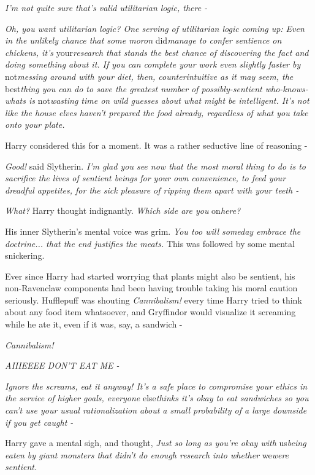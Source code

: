 \emph{I'm not quite sure that's valid utilitarian logic, there -}

\emph{Oh, you want utilitarian logic? One serving of utilitarian logic
coming up: Even in the unlikely chance that some moron} did\emph{manage
to confer sentience on chickens, it's} your\emph{research that stands
the best chance of discovering the fact and doing something about it. If
you can complete your work even slightly faster by} not\emph{messing
around with your diet, then, counterintuitive as it may seem, the}
best\emph{thing you can do to save the greatest number of
possibly-sentient who-knows-whats is} not\emph{wasting time on wild
guesses about what might be intelligent. It's not like the house elves
haven't prepared the food already, regardless of what you take onto your
plate.}

Harry considered this for a moment. It was a rather seductive line of
reasoning -

\emph{Good!} said Slytherin. \emph{I'm glad you see now that the most
moral thing to do is to sacrifice the lives of sentient beings for your
own convenience, to feed your dreadful appetites, for the sick pleasure
of ripping them apart with your teeth -}

\emph{What?} Harry thought indignantly. \emph{Which side are you}
on\emph{here?}

His inner Slytherin's mental voice was grim. \emph{You too will someday
embrace the doctrine... that the end justifies the meats.} This was
followed by some mental snickering.

Ever since Harry had started worrying that plants might also be
sentient, his non-Ravenclaw components had been having trouble taking
his moral caution seriously. Hufflepuff was shouting \emph{Cannibalism!}
every time Harry tried to think about any food item whatsoever, and
Gryffindor would visualize it screaming while he ate it, even if it was,
say, a sandwich -

\emph{Cannibalism!}

\emph{AIIIEEEE DON'T EAT ME -}

\emph{Ignore the screams, eat it anyway! It's a safe place to compromise
your ethics in the service of higher goals, everyone} else\emph{thinks
it's okay to eat sandwiches so you can't use your usual rationalization
about a small probability of a large downside if you get caught -}

Harry gave a mental sigh, and thought, \emph{Just so long as you're okay
with} us\emph{being eaten by giant monsters that didn't do enough
research into whether} we\emph{were sentient.}

